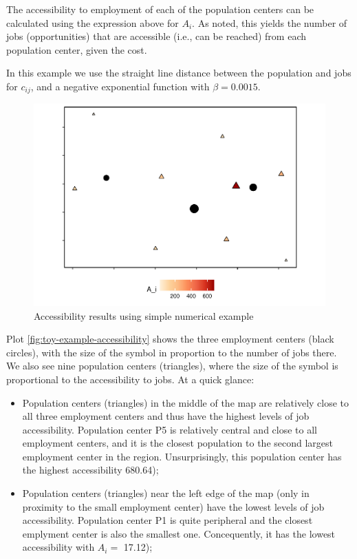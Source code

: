 \documentclass[]{elsarticle} %
\begin{document}
The accessibility to employment of each of the population centers can be
calculated using the expression above for \(A_i\). As noted, this yields
the number of jobs (opportunities) that are accessible (i.e., can be
reached) from each population center, given the cost.

In this example we use the straight line distance between the population
and jobs for \(c_{ij}\), and a negative exponential function with
\(\beta = 0.0015\).

\begin{figure}
\includegraphics[width=1\linewidth]{Spatial-Availability_files/figure-latex/toy-example-accessibility-plot-1} \caption{\label{fig:toy-example-accessibility}Accessibility results using simple numerical example}\label{fig:toy-example-accessibility-plot}
\end{figure}

Plot \ref{fig:toy-example-accessibility} shows the three employment
centers (black circles), with the size of the symbol in proportion to
the number of jobs there. We also see nine population centers
(triangles), where the size of the symbol is proportional to the
accessibility to jobs. At a quick glance:

\begin{itemize}
\item
  Population centers (triangles) in the middle of the map are relatively
  close to all three employment centers and thus have the highest levels
  of job accessibility. Population center P5 is relatively central and
  close to all employment centers, and it is the closest population to
  the second largest employment center in the region. Unsurprisingly,
  this population center has the highest accessibility 680.64);
\item
  Population centers (triangles) near the left edge of the map (only in
  proximity to the small employment center) have the lowest levels of
  job accessibility. Population center P1 is quite peripheral and the
  closest emplyment center is also the smallest one. Concequently, it
  has the lowest accessibility with \(A_i=\) 17.12);
\end{itemize}
\end{document}
